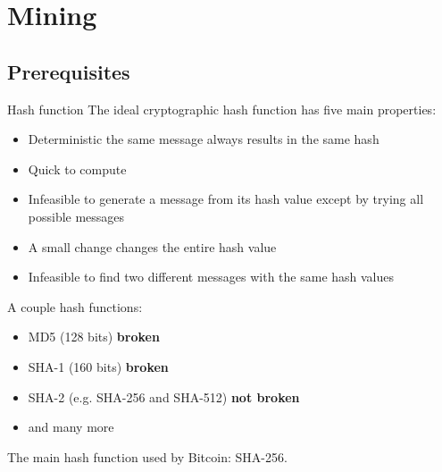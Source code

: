 \documentclass{beamer}
\begin{document}
\section{Mining}
\subsection{Prerequisites}

\begin{frame}
    \begin{block}{Hash function}
        The ideal cryptographic hash function has five main properties:
        \begin{itemize}
            \item Deterministic the same message always results in the same hash
            \item Quick to compute
            \item Infeasible to generate a message from its hash value except by trying all possible messages
            \item A small change changes the entire hash value
            \item Infeasible to find two different messages with the same hash values
        \end{itemize}
    \end{block}
\end{frame}
\begin{frame}
    A couple hash functions:
    \begin{itemize}
        \item MD5 (128 bits) \pause \textbf{broken} \pause
        \item SHA-1 (160 bits) \pause \textbf{broken} \pause
        \item SHA-2 (e.g. SHA-256 and SHA-512) \pause \textbf{not broken} \pause
        \item and many more
    \end{itemize}
    \pause
    The main hash function used by Bitcoin: SHA-256.
\end{frame}
\end{document}

